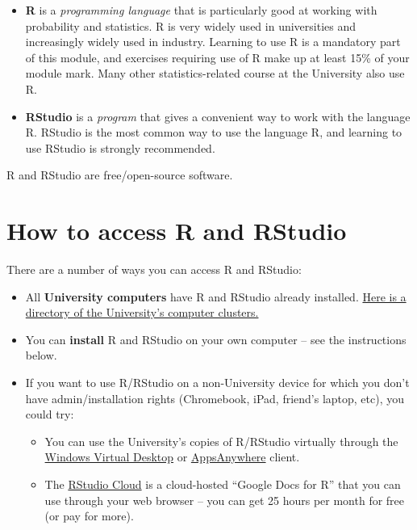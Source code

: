 \documentclass[
  a4paper,
]{book}
\providecommand{\tightlist}{%
  \setlength{\itemsep}{0pt}\setlength{\parskip}{0pt}}
\theoremstyle{definition}
\theoremstyle{definition}
\theoremstyle{definition}
\theoremstyle{definition}
\theoremstyle{remark}
\begin{document}
\begin{itemize}
\tightlist
\item
  \textbf{R} is a \emph{programming language} that is particularly good at working with probability and statistics. R is very widely used in universities and increasingly widely used in industry. Learning to use R is a mandatory part of this module, and exercises requiring use of R make up at least 15\% of your module mark. Many other statistics-related course at the University also use R.
\item
  \textbf{RStudio} is a \emph{program} that gives a convenient way to work with the language R. RStudio is the most common way to use the language R, and learning to use RStudio is strongly recommended.
\end{itemize}

R and RStudio are free/open-source software.

\hypertarget{r-access}{%
\section*{How to access R and RStudio}\label{r-access}}

There are a number of ways you can access R and RStudio:

\begin{itemize}
\tightlist
\item
  All \textbf{University computers} have R and RStudio already installed. \href{https://it.leeds.ac.uk/it/?id=kb_article\&sysparm_article=KB0013658}{Here is a directory of the University's computer clusters.}
\item
  You can \textbf{install} R and RStudio on your own computer -- see the instructions below.
\item
  If you want to use R/RStudio on a non-University device for which you don't have admin/installation rights (Chromebook, iPad, friend's laptop, etc), you could try:

  \begin{itemize}
  \tightlist
  \item
    You can use the University's copies of R/RStudio virtually through the \href{https://it.leeds.ac.uk/it?id=kb_article\&sysparm_article=KB0014379}{Windows Virtual Desktop} or \href{https://it.leeds.ac.uk/it?id=kb_article\&sysparm_article=KB0014827}{AppsAnywhere} client.
  \item
    The \href{https://rstudio.cloud/}{RStudio Cloud} is a cloud-hosted ``Google Docs for R'' that you can use through your web browser -- you can get 25 hours per month for free (or pay for more).
  \end{itemize}
\end{itemize}
\end{document}
